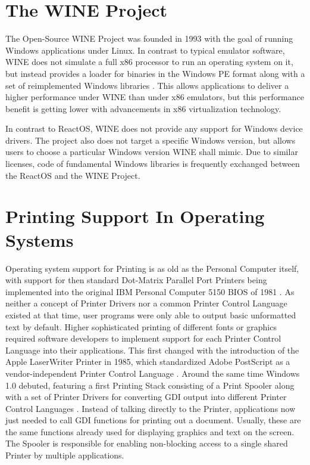 \section{The WINE Project}
The Open-Source WINE Project was founded in 1993 with the goal of running Windows applications under Linux.
In contrast to typical emulator software, WINE does not simulate a full x86 processor to run an operating system on it, but instead provides a loader for binaries in the Windows \gls{PE} format along with a set of reimplemented Windows libraries \cite{gardner1998winefaq}.
This allows applications to deliver a higher performance under WINE than under x86 emulators, but this performance benefit is getting lower with advancements in x86 virtualization technology.

In contrast to ReactOS, WINE does not provide any support for Windows device drivers.
The project also does not target a specific Windows version, but allows users to choose a particular Windows version WINE shall mimic.
Due to similar licenses, code of fundamental Windows libraries is frequently exchanged between the ReactOS and the WINE Project.


\section{Printing Support In Operating Systems}
Operating system support for Printing is as old as the Personal Computer itself, with support for then standard Dot-Matrix Parallel Port Printers being implemented into the original IBM Personal Computer 5150 \gls{BIOS} of 1981 \cite{brooks2015pcdos, powell2010lprng}.
As neither a concept of Printer Drivers nor a common Printer Control Language existed at that time, user programs were only able to output basic unformatted text by default.
Higher sophisticated printing of different fonts or graphics required software developers to implement support for each Printer Control Language into their applications.
This first changed with the introduction of the Apple LaserWriter Printer in 1985, which standardized Adobe PostScript as a vendor-independent Printer Control Language \cite{leurs2013postscript}.
Around the same time Windows 1.0 debuted, featuring a first Printing Stack consisting of a Print Spooler along with a set of Printer Drivers for converting \gls{GDI} output into different Printer Control Languages \cite{kolacki1987windows}.
Instead of talking directly to the Printer, applications now just needed to call \gls{GDI} functions for printing out a document. Usually, these are the same functions already used for displaying graphics and text on the screen.
The Spooler is responsible for enabling non-blocking access to a single shared Printer by multiple applications.

